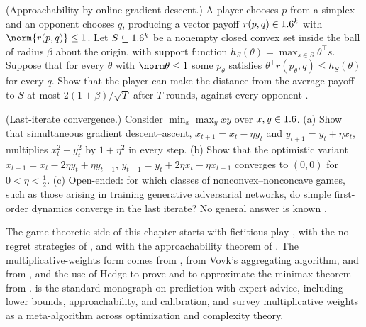 \begin{refsection}
\begin{exercises}
\item \transfer\hard (Approachability by online gradient descent.) A player chooses $p$ from a simplex and an opponent chooses $q$, producing a vector payoff $r(p,q)\in1.6^k$ with $\norm{r(p,q)}\le1$. Let $S\subseteq1.6^k$ be a nonempty closed convex set inside the ball of radius $\beta$ about the origin, with support function $h_S(\theta)=\max_{s\in S}\theta^\top s$. Suppose that for every $\theta$ with $\norm\theta\le1$ some $p_\theta$ satisfies $\theta^\top r(p_\theta,q)\le h_S(\theta)$ for every $q$. Show that the player can make the distance from the average payoff to $S$ at most $2(1+\beta)/\sqrt T$ after $T$ rounds, against every opponent \parencite{Blackwell1956,AbernethyBartlettHazan2011}. \label{ex:regret:approach}

\item \research\harder (Last-iterate convergence.) Consider $\min_x\max_yxy$ over $x,y\in1.6$. (a) Show that simultaneous gradient descent--ascent, $x_{t+1}=x_t-\eta y_t$ and $y_{t+1}=y_t+\eta x_t$, multiplies $x_t^2+y_t^2$ by $1+\eta^2$ in every step. (b) Show that the optimistic variant $x_{t+1}=x_t-2\eta y_t+\eta y_{t-1}$, $y_{t+1}=y_t+2\eta x_t-\eta x_{t-1}$ converges to $(0,0)$ for $0<\eta<\frac12$.  (c) Open-ended: for which classes of nonconvex--nonconcave games, such as those arising in training generative adversarial networks, do simple first-order dynamics converge in the last iterate? No general answer is known \parencite{DaskalakisIlyasSyrgkanisZeng2018}.\label{ex:regret:lastiterate}
\end{exercises}

\notesandrefs

The game-theoretic side of this chapter starts with fictitious play \parencite{Brown1951,Robinson1951}, with the no-regret strategies of \textcite{Hannan1957}, and with the approachability theorem of \textcite{Blackwell1956}. The multiplicative-weights form comes from \textcite{LittlestoneWarmuth1994}, from Vovk's aggregating algorithm, and from \textcite{FreundSchapire1997}, and the use of Hedge to prove and to approximate the minimax theorem from \textcite{FreundSchapire1999}. \textcite{CesaBianchiLugosi2006} is the standard monograph on prediction with expert advice, including lower bounds, approachability, and calibration, and \textcite{AroraHazanKale2012} survey multiplicative weights as a meta-algorithm across optimization and complexity theory.


\end{refsection}
